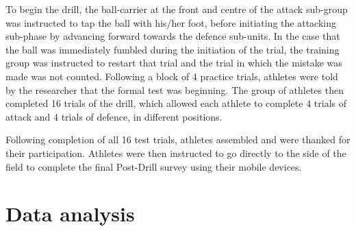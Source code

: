 \begin{CJK}{UTF8}{gbsn}
To begin the drill, the ball-carrier at the front and centre of the attack sub-group was instructed to tap the ball with his/her foot, before initiating the attacking sub-phase by advancing forward towards the defence sub-units.  In the case that the ball was immediately fumbled during the initiation of the trial, the training group was instructed to restart that trial and the trial in which the mistake was made was not counted.  Following a block of 4 practice trials, athletes were told by the researcher that the formal test was beginning.  The group of athletes then completed 16 trials of the drill, which allowed each athlete to complete 4 trials of attack and 4 trials of defence, in different positions.

Following completion of all 16 test trials, athletes assembled and were thanked for their participation.  Athletes were then instructed to go directly to the side of the field to complete the final Post-Drill survey using their mobile devices.




\clearpage
\section{Data analysis}



\end{CJK}

